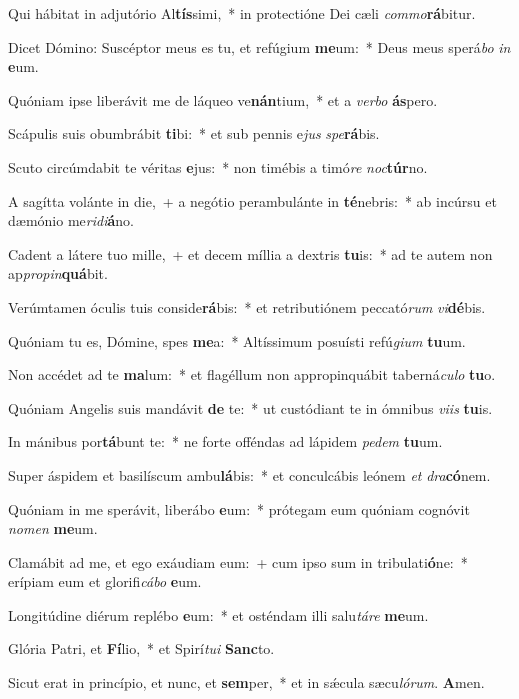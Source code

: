 ﻿Qui hábitat in adjutório Al\textbf{tís}simi,~* in protectióne Dei cæli \textit{com}\textit{mo}\textbf{rá}bitur.

Dicet Dómino: Suscéptor meus es tu, et refúgium \textbf{me}um:~* Deus meus sperá\textit{bo} \textit{in} \textbf{e}um.

Quóniam ipse liberávit me de láqueo ve\textbf{nán}tium,~* et a \textit{ver}\textit{bo} \textbf{ás}pero.

Scápulis suis obumbrábit \textbf{ti}bi:~* et sub pennis e\textit{jus} \textit{spe}\textbf{rá}bis.

Scuto circúmdabit te véritas \textbf{e}jus:~* non timébis a timó\textit{re} \textit{noc}\textbf{túr}no.

A sagítta volánte in die,~+ a negótio perambulánte in \textbf{té}nebris:~* ab incúrsu et dæmónio me\textit{ri}\textit{di}\textbf{á}no.

Cadent a látere tuo mille,~+ et decem míllia a dextris \textbf{tu}is:~* ad te autem non ap\textit{pro}\textit{pin}\textbf{quá}bit.

Verúmtamen óculis tuis conside\textbf{rá}bis:~* et retributiónem peccató\textit{rum} \textit{vi}\textbf{dé}bis.

Quóniam tu es, Dómine, spes \textbf{me}a:~* Altíssimum posuísti refú\textit{gi}\textit{um} \textbf{tu}um.

Non accédet ad te \textbf{ma}lum:~* et flagéllum non appropinquábit taberná\textit{cu}\textit{lo} \textbf{tu}o.

Quóniam Angelis suis mandávit \textbf{de} te:~* ut custódiant te in ómnibus \textit{vi}\textit{is} \textbf{tu}is.

In mánibus por\textbf{tá}bunt te:~* ne forte offéndas ad lápidem \textit{pe}\textit{dem} \textbf{tu}um.

Super áspidem et basilíscum ambu\textbf{lá}bis:~* et conculcábis leónem \textit{et} \textit{dra}\textbf{có}nem.

Quóniam in me sperávit, liberábo \textbf{e}um:~* prótegam eum quóniam cognóvit \textit{no}\textit{men} \textbf{me}um.

Clamábit ad me, et ego exáudiam eum:~+ cum ipso sum in tribulati\textbf{ó}ne:~* erípiam eum et glorifi\textit{cá}\textit{bo} \textbf{e}um.

Longitúdine diérum replébo \textbf{e}um:~* et osténdam illi salu\textit{tá}\textit{re} \textbf{me}um.

Glória Patri, et \textbf{Fí}lio,~* et Spirí\textit{tu}\textit{i} \textbf{Sanc}to.

Sicut erat in princípio, et nunc, et \textbf{sem}per,~* et in sǽcula sæcu\textit{ló}\textit{rum}. \textbf{A}men.